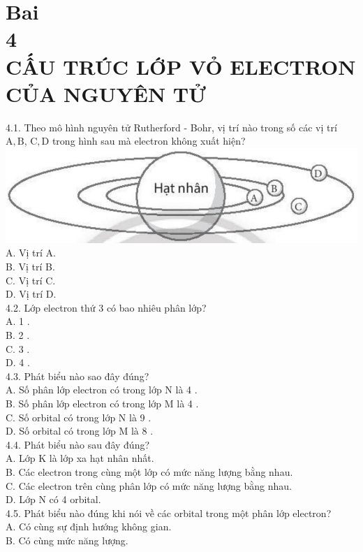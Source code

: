 \documentclass[10pt]{article}
\begin{document}
\section*{Bai \\
 4 \\
 CẤU TRÚC LỚP VỎ ELECTRON CỦA NGUYÊN TỬ}
4.1. Theo mô hình nguyên tử Rutherford - Bohr, vị trí nào trong số các vị trí $\mathrm{A}, \mathrm{B}$, $\mathrm{C}, \mathrm{D}$ trong hình sau mà electron không xuất hiện?\\
\includegraphics[max width=\textwidth, center]{2025_10_23_883c4b146e2332109fcdg-09}\\
A. Vị trí A.\\
B. Vị trí B.\\
C. Vị trí C.\\
D. Vị trí D.\\
4.2. Lớp electron thứ 3 có bao nhiêu phân lớp?\\
A. 1 .\\
B. 2 .\\
C. 3 .\\
D. 4 .\\
4.3. Phát biểu nào sao đây đúng?\\
A. Số phân lớp electron có trong lớp N là 4 .\\
B. Số phân lớp electron có trong lớp M là 4 .\\
C. Số orbital có trong lớp N là 9 .\\
D. Số orbital có trong lớp M là 8 .\\
4.4. Phát biểu nào sau đây đúng?\\
A. Lớp K là lớp xa hạt nhân nhất.\\
B. Các electron trong cùng một lớp có mức năng lượng bằng nhau.\\
C. Các electron trên cùng phân lớp có mức năng lượng bằng nhau.\\
D. Lớp N có 4 orbital.\\
4.5. Phát biểu nào đúng khi nói về các orbital trong một phân lớp electron?\\
A. Có cùng sự định hướng không gian.\\
B. Có cùng mức năng lượng.\\
\end{document}
